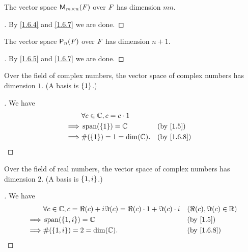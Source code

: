 \begin{eg}\label{1.6.11}
  The vector space \(\ms\) over \(\mathit{F}\) has dimension \(mn\).
\end{eg}

\begin{proof}[]
  By \cref{1.6.4} and \cref{1.6.7} we are done.
\end{proof}

\begin{eg}\label{1.6.12}
  The vector space \(\ps[n]{\F}\) over \(\mathit{F}\) has dimension \(n + 1\).
\end{eg}

\begin{proof}[]
  By \cref{1.6.5} and \cref{1.6.7} we are done.
\end{proof}

\begin{eg}\label{1.6.13}
  Over the field of complex numbers, the vector space of complex numbers has dimension \(1\).
  (A basis is \(\left\lbrace1\right\rbrace\).)
\end{eg}

\begin{proof}[]
  We have
  \begin{align*}
             & \forall c \in \C, c = c \cdot 1                 \\
    \implies & \spn{\set{1}} = \C              &  & \by{1.5}   \\
    \implies & \#\pa{\set{1}} = 1 = \dim(\C).  &  & \by{1.6.8}
  \end{align*}
\end{proof}

\begin{eg}\label{1.6.14}
  Over the field of real numbers, the vector space of complex numbers has dimension \(2\).
  (A basis is \(\left\lbrace1, i\right\rbrace\).)
\end{eg}

\begin{proof}[]
  We have
  \begin{align*}
             & \forall c \in \C, c = \Re(c) + i \Im(c) = \Re(c) \cdot 1 + \Im(c) \cdot i &  & (\Re(c), \Im(c) \in \R) \\
    \implies & \spn{\set{1, i}} = \C                                                     &  & \by{1.5}                \\
    \implies & \#\pa{\set{1, i}} = 2 = \dim(\C).                                         &  & \by{1.6.8}
  \end{align*}
\end{proof}

